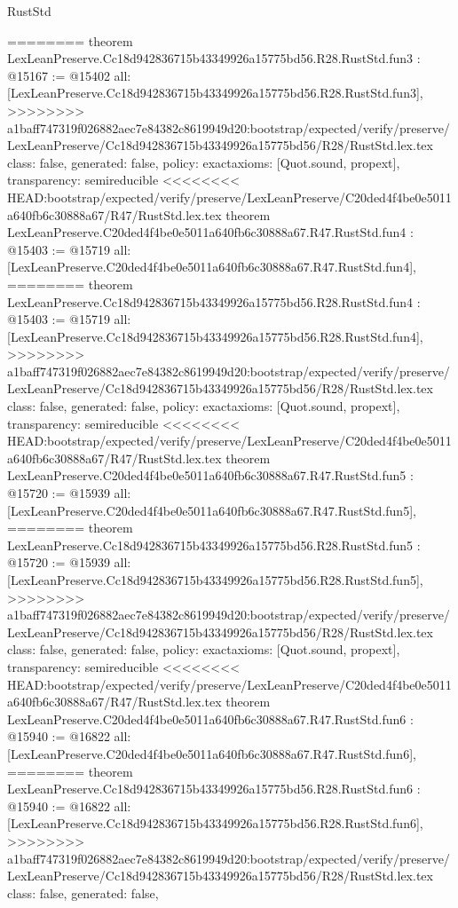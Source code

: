 \begin{lexlean}{RustStd}
\begin{coremodule}
{\begin{coremodule}
{{{{{{========
theorem LexLeanPreserve.Cc18d942836715b43349926a15775bd56.R28.RustStd.fun3 : @15167 := @15402 {
  all: [LexLeanPreserve.Cc18d942836715b43349926a15775bd56.R28.RustStd.fun3],
>>>>>>>> a1baff747319f026882aec7e84382c8619949d20:bootstrap/expected/verify/preserve/LexLeanPreserve/Cc18d942836715b43349926a15775bd56/R28/RustStd.lex.tex
  class: false,
  generated: false,
  policy: exact{axioms: [Quot.sound, propext]},
  transparency: semireducible
}
<<<<<<<< HEAD:bootstrap/expected/verify/preserve/LexLeanPreserve/C20ded4f4be0e5011a640fb6c30888a67/R47/RustStd.lex.tex
theorem LexLeanPreserve.C20ded4f4be0e5011a640fb6c30888a67.R47.RustStd.fun4 : @15403 := @15719 {
  all: [LexLeanPreserve.C20ded4f4be0e5011a640fb6c30888a67.R47.RustStd.fun4],
========
theorem LexLeanPreserve.Cc18d942836715b43349926a15775bd56.R28.RustStd.fun4 : @15403 := @15719 {
  all: [LexLeanPreserve.Cc18d942836715b43349926a15775bd56.R28.RustStd.fun4],
>>>>>>>> a1baff747319f026882aec7e84382c8619949d20:bootstrap/expected/verify/preserve/LexLeanPreserve/Cc18d942836715b43349926a15775bd56/R28/RustStd.lex.tex
  class: false,
  generated: false,
  policy: exact{axioms: [Quot.sound, propext]},
  transparency: semireducible
}
<<<<<<<< HEAD:bootstrap/expected/verify/preserve/LexLeanPreserve/C20ded4f4be0e5011a640fb6c30888a67/R47/RustStd.lex.tex
theorem LexLeanPreserve.C20ded4f4be0e5011a640fb6c30888a67.R47.RustStd.fun5 : @15720 := @15939 {
  all: [LexLeanPreserve.C20ded4f4be0e5011a640fb6c30888a67.R47.RustStd.fun5],
========
theorem LexLeanPreserve.Cc18d942836715b43349926a15775bd56.R28.RustStd.fun5 : @15720 := @15939 {
  all: [LexLeanPreserve.Cc18d942836715b43349926a15775bd56.R28.RustStd.fun5],
>>>>>>>> a1baff747319f026882aec7e84382c8619949d20:bootstrap/expected/verify/preserve/LexLeanPreserve/Cc18d942836715b43349926a15775bd56/R28/RustStd.lex.tex
  class: false,
  generated: false,
  policy: exact{axioms: [Quot.sound, propext]},
  transparency: semireducible
}
<<<<<<<< HEAD:bootstrap/expected/verify/preserve/LexLeanPreserve/C20ded4f4be0e5011a640fb6c30888a67/R47/RustStd.lex.tex
theorem LexLeanPreserve.C20ded4f4be0e5011a640fb6c30888a67.R47.RustStd.fun6 : @15940 := @16822 {
  all: [LexLeanPreserve.C20ded4f4be0e5011a640fb6c30888a67.R47.RustStd.fun6],
========
theorem LexLeanPreserve.Cc18d942836715b43349926a15775bd56.R28.RustStd.fun6 : @15940 := @16822 {
  all: [LexLeanPreserve.Cc18d942836715b43349926a15775bd56.R28.RustStd.fun6],
>>>>>>>> a1baff747319f026882aec7e84382c8619949d20:bootstrap/expected/verify/preserve/LexLeanPreserve/Cc18d942836715b43349926a15775bd56/R28/RustStd.lex.tex
  class: false,
  generated: false,
}}}}}}}}}}
\end{coremodule}}
\end{coremodule}
\end{lexlean}
